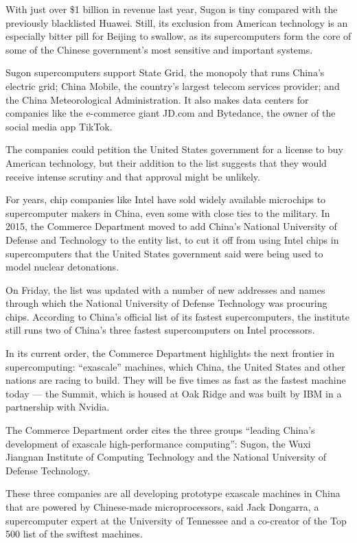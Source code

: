 With just over \$1 billion in revenue last year, Sugon is tiny compared
with the previously blacklisted Huawei. Still, its exclusion from
American technology is an especially bitter pill for Beijing to swallow,
as its supercomputers form the core of some of the Chinese government's
most sensitive and important systems.

Sugon supercomputers support State Grid, the monopoly that runs China's
electric grid; China Mobile, the country's largest telecom services
provider; and the China Meteorological Administration. It also makes
data centers for companies like the e-commerce giant JD.com and
Bytedance, the owner of the social media app TikTok.

The companies could petition the United States government for a license
to buy American technology, but their addition to the list suggests that
they would receive intense scrutiny and that approval might be unlikely.

For years, chip companies like Intel have sold widely available
microchips to supercomputer makers in China, even some with close ties
to the military. In 2015, the Commerce Department moved to add China's
National University of Defense and Technology to the entity list, to cut
it off from using Intel chips in supercomputers that the United States
government said were being used to model nuclear detonations.

On Friday, the list was updated with a number of new addresses and names
through which the National University of Defense Technology was
procuring chips. According to China's official list of its fastest
supercomputers, the institute still runs two of China's three fastest
supercomputers on Intel processors.

In its current order, the Commerce Department highlights the next
frontier in supercomputing: ``exascale'' machines, which China, the
United States and other nations are racing to build. They will be five
times as fast as the fastest machine today --- the Summit, which is
housed at Oak Ridge and was built by IBM in a partnership with Nvidia.

The Commerce Department order cites the three groups ``leading China's
development of exascale high-performance computing'': Sugon, the Wuxi
Jiangnan Institute of Computing Technology and the National University
of Defense Technology.

These three companies are all developing prototype exascale machines in
China that are powered by Chinese-made microprocessors, said Jack
Dongarra, a supercomputer expert at the University of Tennessee and a
co-creator of the Top 500 list of the swiftest machines.

